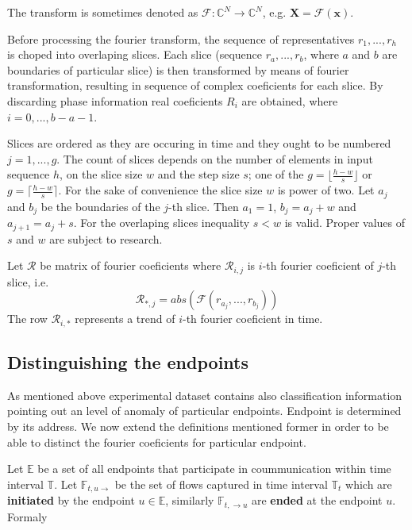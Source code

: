 \documentclass[a4paper,journal]{IEEEtran}
\begin{document}
The transform is sometimes denoted as 
$\mathcal{F}\colon\mathbb{C}^N \to \mathbb{C}^N$, e.g.
$\mathbf{X} = \mathcal{F} \left ( \mathbf{x} \right )$.

Before processing the fourier transform, the sequence of representatives 
$r_1, ...,r_h$ is choped into overlaping slices.
Each slice (sequence $r_a, ..., r_b$, where $a$ and $b$ are boundaries
of particular slice) is then transformed by means of fourier transformation,
resulting in sequence of complex coeficients for each slice.
By discarding phase information real coeficients ${R}_i$ are obtained,
where $i = 0, ..., b-a-1$.

Slices are ordered as they are occuring in time and they ought to be numbered
$j = 1,..., g $. The count of slices  depends on the number of elements 
in input sequence $h$, on the slice size $w$ and the step size $s$; one of the
$g=\lfloor\frac{h-w}{s} \rfloor$ or $g=\lceil\frac{h-w}{s} \rceil$.
For the sake of convenience the slice size $w$ is power of two.
Let $a_j$ and $b_j$ be the boundaries of the $j$-th slice. Then
$a_1 = 1$, $b_j = a_j + w$ and $a_{j+1} = a_j + s$.
For the overlaping slices inequality $s < w$ is valid.
Proper values of $s$ and $w$ are subject to research.

Let $\mathcal{R}$ be matrix of fourier coeficients where
$\mathcal{R}_{i,j}$ is $i$-th fourier coeficient of $j$-th slice,
i.e. 
\begin{equation}
\mathcal{R}_{*,j} = abs(\mathcal{F}(r_{a_j}, ..., r_{b_j}))
\end{equation}
The row $\mathcal{R}_{i,*}$ represents a trend of $i$-th fourier
coeficient in time.

\subsection{Distinguishing the endpoints}
As mentioned above experimental dataset contains also
classification information pointing out an level of anomaly of 
particular endpoints. Endpoint is determined by its address.
We now extend the definitions mentioned
former in order to be able to distinct the fourier coeficients for
particular endpoint.

Let $\mathbb{E}$ be a set of all endpoints that
participate in coummunication within time interval $\mathbb{T}$.
Let $\mathbb{F}_{t,u \rightarrow}$ be the set of flows captured in
time interval $\mathbb{T}_{t}$ %
which are \textbf{initiated} by the endpoint $u \in \mathbb{E}$,
similarly $\mathbb{F}_{t, \rightarrow u}$ are \textbf{ended} at the
endpoint $u$. Formaly
\end{document}
